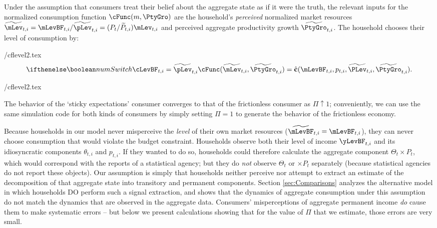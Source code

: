 \documentclass[titlepage]{\econtex}\newcommand{\texname}{cAndCwithStickyE}
\begin{document}
Under the assumption that consumers treat their belief about the aggregate state as if it were the truth, the relevant inputs for the normalized consumption function $\cFunc(m,\PtyGro)$ are the household's \textit{perceived} normalized market resources $\perc{\mLev}_{t,i} = \mLevBF_{t,i}/\perc{\pLev}_{t,i} = (P_t/\perc{P}_{t,i})\mLev_{t,i}$ and perceived aggregate productivity growth $\perc{\PtyGro}_{t,i}$.  The household chooses their level of consumption by:
\begin{verbatimwrite}{\eq/cflevel2.tex}
\begin{equation}
 \ifnumSw \cLevBF_{t,i} = \perc{\pLev}_{t,i} \cFunc(\perc{\mLev}_{t,i},\perc{\PtyGro}_{t,i}) = \hat{\textbf{c}}(\mLevBF_{t,i}, p_{t,i}, \perc{\PLev}_{t,i}, \perc{\PtyGro}_{t,i}). \label{eq:cPerc}
\end{equation}
\end{verbatimwrite}
 {\eq/cflevel2.tex}

The behavior of the `sticky expectations' consumer converges to that of the frictionless consumer as $\Pi \uparrow 1$; conveniently, we can use the same simulation code for both kinds of consumers by simply setting $\Pi = 1$ to generate the behavior of the frictionless economy.

Because households in our model never misperceive the \textit{level} of their own market resources ($\perc{\mLevBF}_{t,i}=\mLevBF_{t,i}$), they can never choose consumption that would violate the budget constraint.  Households observe both their level of income $\yLevBF_{t,i}$ and its idiosyncratic components $\theta_{t,i}$ and ${p}_{t,i}$. If they wanted to do so, households could therefore calculate the aggregate component $\Theta_{t}\times {P}_{t}$, which would correspond with the reports of a statistical agency; but they do \textit{not} observe $\Theta_{t}$ or $\times{P}_{t}$ separately (because statistical agencies do not report these objects).  Our assumption is simply that households neither perceive nor attempt to extract an estimate of the decomposition of that aggregate state into transitory and permanent components.  Section \ref{sec:Comparisons} analyzes the alternative model in which households DO perform such a signal extraction, and shows that the dynamics of aggregate consumption under this assumption do not match the dynamics that are observed in the aggregate data.  Consumers'  misperceptions of aggregate permanent income \textit{do} cause them to make systematic errors -- but below we present calculations showing that for the value of $\Pi$ that we estimate, those errors are very small.
\end{document}
